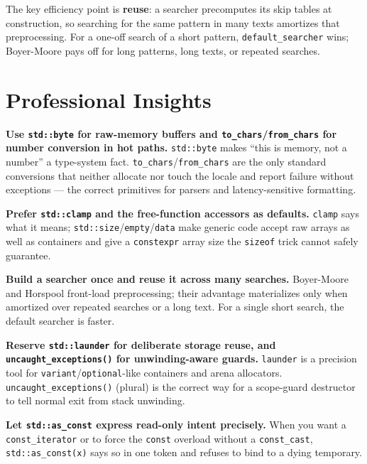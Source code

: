 The key efficiency point is \textbf{reuse}: a searcher precomputes its skip tables at construction, so searching for the same pattern in many texts amortizes that preprocessing. For a one-off search of a short pattern, \texttt{default\_searcher} wins; Boyer-Moore pays off for long patterns, long texts, or repeated searches.

\section{Professional Insights}
\label{sec:c17-stdlib-insights}

\textbf{Use \texttt{std::byte} for raw-memory buffers and \texttt{to\_chars}/\texttt{from\_chars} for number conversion in hot paths.} \texttt{std::byte} makes ``this is memory, not a number'' a type-system fact. \texttt{to\_chars}/\texttt{from\_chars} are the only standard conversions that neither allocate nor touch the locale and report failure without exceptions --- the correct primitives for parsers and latency-sensitive formatting.

\textbf{Prefer \texttt{std::clamp} and the free-function accessors as defaults.} \texttt{clamp} says what it means; \texttt{std::size}/\texttt{empty}/\texttt{data} make generic code accept raw arrays as well as containers and give a \texttt{constexpr} array size the \texttt{sizeof} trick cannot safely guarantee.

\textbf{Build a searcher once and reuse it across many searches.} Boyer-Moore and Horspool front-load preprocessing; their advantage materializes only when amortized over repeated searches or a long text. For a single short search, the default searcher is faster.

\textbf{Reserve \texttt{std::launder} for deliberate storage reuse, and \texttt{uncaught\_exceptions()} for unwinding-aware guards.} \texttt{launder} is a precision tool for \texttt{variant}/\texttt{optional}-like containers and arena allocators. \texttt{uncaught\_exceptions()} (plural) is the correct way for a scope-guard destructor to tell normal exit from stack unwinding.

\textbf{Let \texttt{std::as\_const} express read-only intent precisely.} When you want a \texttt{const\_iterator} or to force the \texttt{const} overload without a \texttt{const\_cast}, \texttt{std::as\_const(x)} says so in one token and refuses to bind to a dying temporary.
